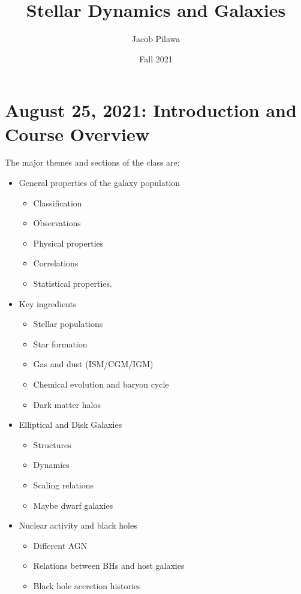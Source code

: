 \documentclass{article}
\title{Stellar Dynamics and Galaxies}
\author{Jacob Pilawa}
\date{Fall 2021}
\begin{document}
\maketitle
\tableofcontents
\newpage

\section{August 25, 2021: Introduction and Course Overview}

The major themes and sections of the class are:

\begin{itemize}
    \item General properties of the galaxy population
    \begin{itemize}
        \item Classification
        \item Observations
        \item Physical properties
        \item Correlations
        \item Statistical properties. 
    \end{itemize}
    \item Key ingredients
    \begin{itemize}
        \item Stellar populations
        \item Star formation
        \item Gas and dust (ISM/CGM/IGM)
        \item Chemical evolution and baryon cycle
        \item Dark matter halos
    \end{itemize}
    \item Elliptical and Disk Galaxies
    \begin{itemize}
        \item Structures
        \item Dynamics
        \item Scaling relations
        \item Maybe dwarf galaxies
    \end{itemize}
    \item Nuclear activity and black holes
    \begin{itemize}
        \item Different AGN
        \item Relations between BHs and host galaxies
        \item Black hole accretion histories

\end{itemize}
\end{itemize}
\end{document}
